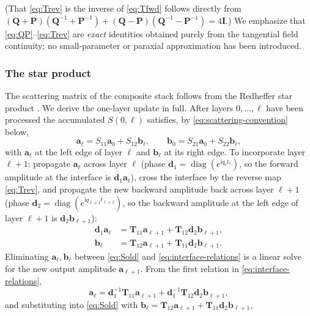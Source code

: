 \documentclass[11pt]{article}
\theoremstyle{remark}
\newcommand{\fa}{\mathbf{a}}
\newcommand{\fb}{\mathbf{b}}
\newcommand{\Id}{\mathbf{I}}
\DeclareMathOperator{\diag}{diag}
\newcommand{\ii}{\mathrm{i}}
\begin{document}
(That \eqref{eq:Trev} is the inverse of \eqref{eq:Tfwd} follows directly from
$(\mathbf{Q}+\mathbf{P})(\mathbf{Q}^{-1}+\mathbf{P}^{-1})
+(\mathbf{Q}-\mathbf{P})(\mathbf{Q}^{-1}-\mathbf{P}^{-1})=4\Id$.)
We emphasize that \eqref{eq:QP}--\eqref{eq:Trev} are \emph{exact} identities
obtained purely from the tangential field continuity; no small-parameter or
paraxial approximation has been introduced.

\subsubsection{The star product}

The scattering matrix of the composite stack follows from the Redheffer star
product \cite{redheffer1962transmission,li1996recursive}.  We derive the
one-layer update in full.  After layers $0,\dots,\ell$ have been processed the
accumulated $S(0,\ell)$ satisfies, by \eqref{eq:scattering-convention} below,
\begin{equation}
\fa_\ell=S_{11}\fa_0+S_{12}\fb_\ell,\qquad
\fb_0=S_{21}\fa_0+S_{22}\fb_\ell,
\label{eq:Sold}
\end{equation}
with $\fa_\ell$ at the left edge of layer $\ell$ and $\fb_\ell$ at its right
edge.  To incorporate layer $\ell+1$: propagate $\fa_\ell$ across layer
$\ell$ (phase $\mathbf{d}_1=\diag(e^{\ii q_\ell t_\ell})$, so the forward
amplitude at the interface is $\mathbf{d}_1\fa_\ell$), cross the interface by
the reverse map \eqref{eq:Trev}, and propagate the new backward amplitude back
across layer $\ell+1$ (phase
$\mathbf{d}_2=\diag(e^{\ii q_{\ell+1}t_{\ell+1}})$, so the backward amplitude
at the left edge of layer $\ell+1$ is $\mathbf{d}_2\fb_{\ell+1}$):
\begin{align}
\mathbf{d}_1\fa_\ell&=\mathbf{T}_{11}\fa_{\ell+1}
+\mathbf{T}_{12}\mathbf{d}_2\fb_{\ell+1},\\
\fb_\ell&=\mathbf{T}_{12}\fa_{\ell+1}
+\mathbf{T}_{11}\mathbf{d}_2\fb_{\ell+1}.
\label{eq:interface-relations}
\end{align}
Eliminating $\fa_\ell,\fb_\ell$ between \eqref{eq:Sold} and
\eqref{eq:interface-relations} is a linear solve for the new output amplitude
$\fa_{\ell+1}$.  From the first relation in \eqref{eq:interface-relations},
\begin{equation}
\fa_\ell=\mathbf{d}_1^{-1}\mathbf{T}_{11}\fa_{\ell+1}
+\mathbf{d}_1^{-1}\mathbf{T}_{12}\mathbf{d}_2\fb_{\ell+1},
\end{equation}
and substituting into \eqref{eq:Sold} with
$\fb_\ell=\mathbf{T}_{12}\fa_{\ell+1}+\mathbf{T}_{11}\mathbf{d}_2\fb_{\ell+1}$,
\end{document}
